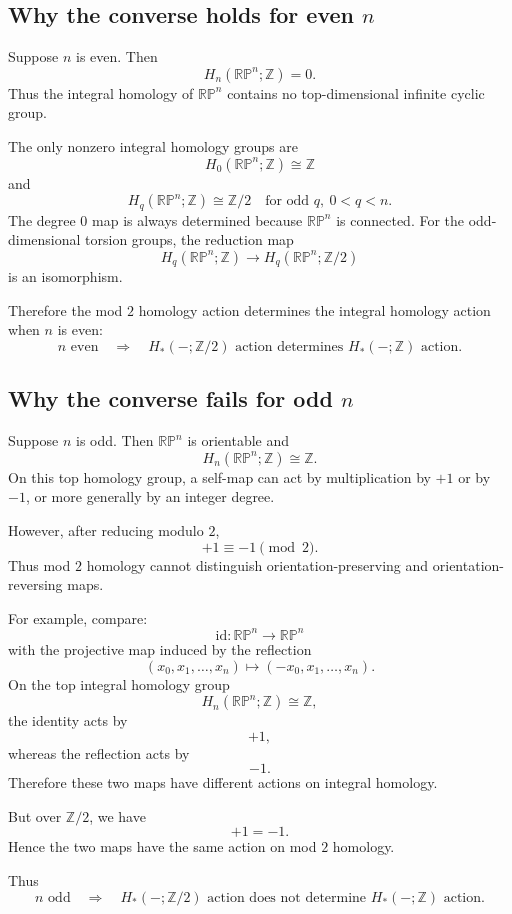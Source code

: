 \documentclass[12pt,a4paper]{article}
\theoremstyle{notespace}
\begin{document}
\subsection{Why the converse holds for even \(n\)}

Suppose \(n\) is even. Then
\[
H_n(\mathbb{RP}^n;\mathbb Z)=0.
\]
Thus the integral homology of \(\mathbb{RP}^n\) contains no top-dimensional infinite cyclic group.

The only nonzero integral homology groups are
\[
H_0(\mathbb{RP}^n;\mathbb Z)\cong \mathbb Z
\]
and
\[
H_q(\mathbb{RP}^n;\mathbb Z)\cong \mathbb Z/2
\quad
\text{for odd }q,\ 0<q<n.
\]
The degree \(0\) map is always determined because \(\mathbb{RP}^n\) is connected. For the odd-dimensional torsion groups, the reduction map
\[
H_q(\mathbb{RP}^n;\mathbb Z)
\longrightarrow
H_q(\mathbb{RP}^n;\mathbb Z/2)
\]
is an isomorphism.

Therefore the mod \(2\) homology action determines the integral homology action when \(n\) is even:
\[
\boxed{
	n\text{ even}
	\quad\Longrightarrow\quad
	H_*(-;\mathbb Z/2)\text{ action determines }H_*(-;\mathbb Z)\text{ action}.
}
\]

\subsection{Why the converse fails for odd \(n\)}

Suppose \(n\) is odd. Then \(\mathbb{RP}^n\) is orientable and
\[
H_n(\mathbb{RP}^n;\mathbb Z)\cong \mathbb Z.
\]
On this top homology group, a self-map can act by multiplication by \(+1\) or by \(-1\), or more generally by an integer degree.

However, after reducing modulo \(2\),
\[
+1\equiv -1\pmod 2.
\]
Thus mod \(2\) homology cannot distinguish orientation-preserving and orientation-reversing maps.

For example, compare:
\[
\mathrm{id}:\mathbb{RP}^n\longrightarrow \mathbb{RP}^n
\]
with the projective map induced by the reflection
\[
(x_0,x_1,\dots,x_n)
\longmapsto
(-x_0,x_1,\dots,x_n).
\]
On the top integral homology group
\[
H_n(\mathbb{RP}^n;\mathbb Z)\cong \mathbb Z,
\]
the identity acts by
\[
+1,
\]
whereas the reflection acts by
\[
-1.
\]
Therefore these two maps have different actions on integral homology.

But over \(\mathbb Z/2\), we have
\[
+1=-1.
\]
Hence the two maps have the same action on mod \(2\) homology.

Thus
\[
\boxed{
	n\text{ odd}
	\quad\Longrightarrow\quad
	H_*(-;\mathbb Z/2)\text{ action does not determine }H_*(-;\mathbb Z)\text{ action}.
}
\]
\end{document}
